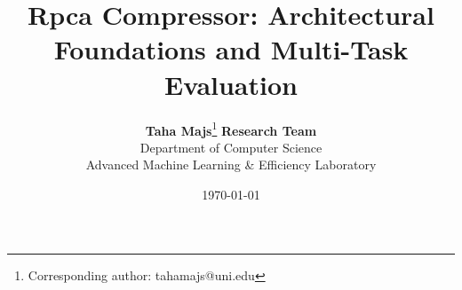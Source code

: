 \title{\textbf{Rpca Compressor: Architectural Foundations and Multi-Task Evaluation}}

\author{
  \textbf{Taha Majs}\thanks{Corresponding author: tahamajs@uni.edu} \quad \textbf{Research Team} \\
  Department of Computer Science \\
  Advanced Machine Learning \& Efficiency Laboratory
}

\date{\today}
